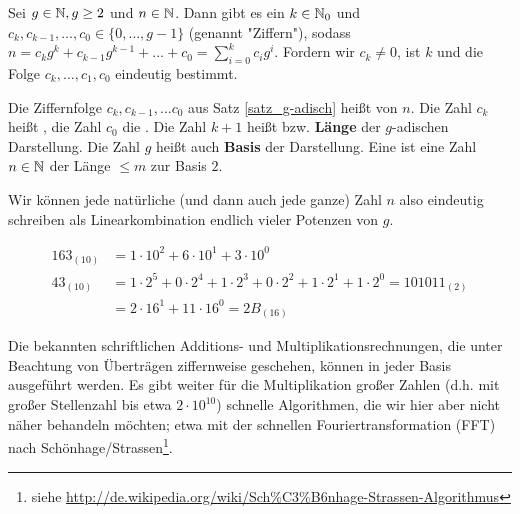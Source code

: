 \begin{satz}
\label{satz_g-adisch}
	Sei $g \in \mathbb{N}, g \geq 2$ und $n \in \mathbb{N}$. Dann gibt es ein $k \in \mathbb{N}_0$ und $c_k, c_{k-1}, \dots, c_0 \in \{0, \dots, g-1\}$ (genannt "Ziffern"), sodass $n = c_k g^k + c_{k-1} g^{k-1} + \dots + c_0 = \sum_{i=0}^k c_i g^i$. Fordern wir $c_k \neq 0$, ist $k$ und die Folge $c_k, \dots, c_1, c_0$ eindeutig bestimmt. 
\end{satz}

\begin{defn}
	Die Ziffernfolge $c_k, c_{k-1}, \dots c_0$ aus Satz \ref{satz_g-adisch} heißt  von $n$. Die Zahl $c_k$ heißt , die Zahl $c_0$ die . Die Zahl $k+1$ heißt  bzw. \textbf{Länge} der $g$-adischen Darstellung. Die Zahl $g$ heißt auch \textbf{Basis} der Darstellung. Eine  ist eine Zahl $n \in \mathbb{N}$ der Länge $\leq m$ zur Basis $2$.  
\end{defn}

\begin{bem}
	Wir können jede natürliche (und dann auch jede ganze) Zahl $n$ also eindeutig schreiben als Linearkombination endlich vieler Potenzen von $g$.
\end{bem}

\begin{bsp}
 \begin{equation}
 \begin{aligned}
	 163_{(10)} &= 1 \cdot 10^2 + 6 \cdot 10^1 + 3 \cdot 10^0 \\
	 43_{(10)}	&= 1 \cdot 2^5 + 0 \cdot 2^4 + 1 \cdot 2^3 + 0 \cdot 2^2 + 1 \cdot 2^1 + 1 \cdot 2^0 = 101011_{(2)} \\
	 &= 2 \cdot 16^1 + 11 \cdot 16^0 = 2B_{(16)}
 \end{aligned}
 \end{equation}
\end{bsp}

Die bekannten schriftlichen Additions- und Multiplikationsrechnungen, die unter Beachtung von Überträgen ziffernweise geschehen, können in jeder Basis ausgeführt werden. Es gibt weiter für die Multiplikation großer Zahlen (d.h. mit großer Stellenzahl bis etwa $2 \cdot 10^{10}$) schnelle Algorithmen, die wir hier aber nicht näher behandeln möchten; etwa mit der schnellen Fouriertransformation (FFT) nach Schönhage/Strassen\footnote{siehe \url{http://de.wikipedia.org/wiki/Sch\%C3\%B6nhage-Strassen-Algorithmus}}.

